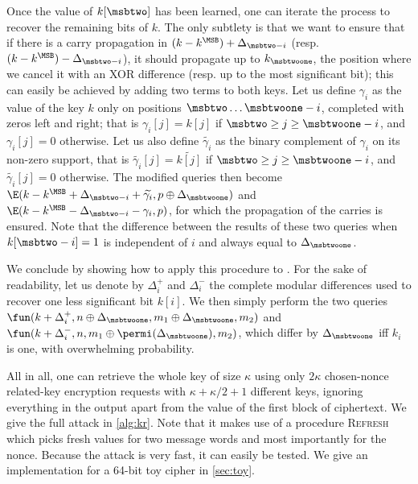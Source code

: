Once the value of $k[\msbtwo]$ has been learned, one can iterate the process to recover the remaining bits of $k$.
The only subtlety is that we want to ensure that if there is a carry propagation in
$(k - k^\MSB) + \Delta_{\msbtwo - i}$ (resp. $(k - k^\MSB) - \Delta_{\msbtwo - i}$),
it should propagate up to $k_{\msbtwoone}$, the position where we cancel it with an XOR difference
(resp. up to the most significant bit); this can easily be achieved by adding two terms to both keys.
Let us define $\gamma_i$ as the value of the key $k$ only on positions $\msbtwo\ldots\msbtwoone - i$, completed with zeros left and right;
that is $\gamma_i[j] = k[j]$ if $\msbtwo \geq j \geq \msbtwoone - i$, and $\gamma_i[j] = 0$ otherwise.
Let us also define $\widetilde{\gamma_i}$ as the binary complement of $\gamma_i$ on its non-zero support,
that is $\widetilde{\gamma_i}[j] = \widetilde{k[j]}$ if $\msbtwo \geq j \geq \msbtwoone - i$, and $\widetilde{\gamma_i}[j] = 0$ otherwise.
The modified queries then become $\E(k - k^\MSB + \Delta_{\msbtwo - i} + \widetilde{\gamma_i}, p \oplus \Delta_{\msbtwoone})$ and
$\E(k - k^\MSB - \Delta_{\msbtwo - i} - \gamma_i, p)$, for which the propagation of the carries is ensured. Note that
the difference between the results of these two queries when $k[\msbtwo - i] = 1$ is independent of $i$ and always equal
to $\Delta_\msbtwoone$. 


We conclude by showing how to apply this procedure to \proestotr. For the sake of readability, let us denote
by $\Delta_i^+$ and $\Delta_i^-$ the complete modular differences used to recover one less significant bit $k[i]$.
We then simply perform the two queries $\fun(k + \Delta_i^+, n \oplus \Delta_{\msbtwoone}, m_1 \oplus \Delta_{\msbtwoone}, m_2)$
and $\fun(k + \Delta_i^-, n, m_1 \oplus \permi(\Delta_{\msbtwoone}), m_2)$, which differ by $\Delta_{\msbtwoone}$ iff $k_i$ is one,
with overwhelming probability.

All in all, one can retrieve the whole key of size
$\kappa$ using only $2\kappa$ chosen-nonce related-key encryption requests with $\kappa + \kappa/2 + 1$ different keys, ignoring
everything in the output apart from the value of the first block
of ciphertext. We give the full attack in \autoref{alg:kr}. Note that it makes use
of a procedure \textsc{Refresh} which picks fresh values for two message words and most importantly
for the nonce. Because
the attack is very fast, it can easily be tested. We give an implementation
for a 64-bit toy cipher in \autoref{sec:toy}.

